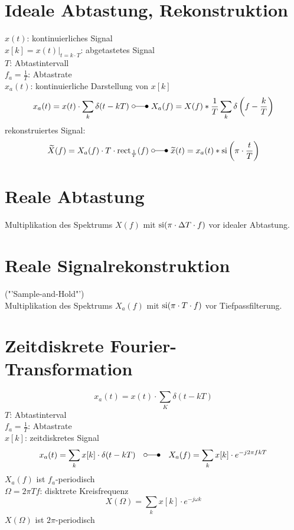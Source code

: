 \documentclass[a4paper, 10pt, fleqn]{article}
\begin{document}
\section{Ideale Abtastung, Rekonstruktion}
$x(t)$: kontinuierliches Signal\\
$x[k] = x(t) |_{t=k \cdot T}$: abgetastetes Signal\\
$T$: Abtastintervall\\
$f_a = \frac{1}{T}$: Abtastrate\\
$x_a(t)$: kontinuierliche Darstellung von $x[k]$\\
\[ x_a(t) = x(t) \cdot \sum\limits_{k} \delta (t - kT) ~ \laplace ~ 
X_a(f) = X(f) * \frac{1}{T} \sum\limits_{k} \delta \left(f - \frac{k}{T}\right) \]
rekonstruiertes Signal:
\[ \widetilde{X}(f) = X_a(f) \cdot T \cdot \rect_{\frac{1}{T}}(f) ~ \laplace ~ 
\widetilde{x}(t) = x_a(t) * \si\left(\pi \cdot \frac{t}{T}\right) \]

\section{Reale Abtastung}
Multiplikation  des Spektrums $X(f)$ mit $\operatorname{si}(\pi \cdot \Delta T \cdot f)$ vor 
idealer Abtastung. 

\section{Reale Signalrekonstruktion}
("'Sample-and-Hold"')\\
Multiplikation des Spektrums $X_a(f)$ mit $\operatorname{si}(\pi \cdot T \cdot f)$ vor 
Tiefpassfilterung. 

\section{Zeitdiskrete Fourier-Transformation}
\[ x_a(t) = x(t) \cdot \sum\limits_{K} \delta (t - kT) \]
$T$: Abtastinterval \\
$f_a = \frac{1}{T}$: Abtastrate \\
$x[k]$: zeitdiskretes Signal
\[ 
    x_a(t) = \sum\limits_k x[k] \cdot \delta (t - kT)
    \quad \laplace \quad
    X_a(f) = \sum\limits_k x[k] \cdot e^{-j2\pi f k T}
\]
$X_a(f)$ ist $f_a$-periodisch \\
$\Omega = 2 \pi T f$: disktrete Kreisfrequenz
\[ X(\Omega) = \sum\limits_k x[k] \cdot e^{-j \omega k} \]
$X(\Omega)$ ist $2 \pi$-periodisch
\end{document}
